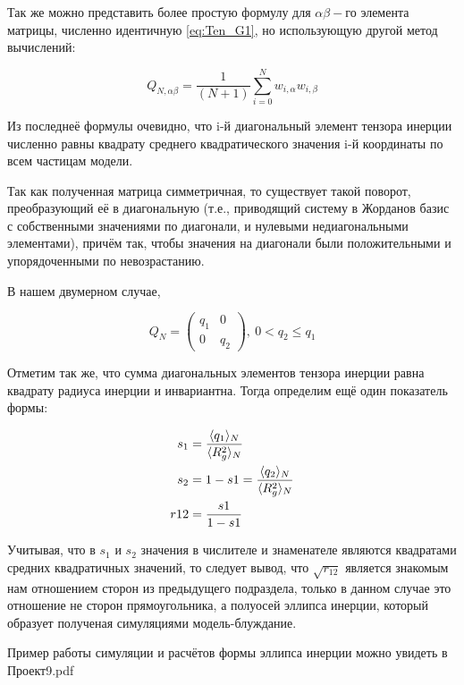 Так же можно представить более простую формулу для  $\alpha\beta-$го элемента матрицы, численно идентичную \eqref{eq:Ten_G1}, но использующую другой метод вычислений:

\begin{equation}\label{eq:Ten_G2}
    Q_{N,\alpha\beta} = \frac{1}{(N+1)} \sum_{i=0}^{N} w_{i, \alpha} w_{i, \beta}
\end{equation}

Из последнеё формулы очевидно, что i-й диагональный элемент тензора инерции численно равны квадрату среднего квадратического значения i-й координаты по всем частицам модели.

Так как полученная матрица симметричная, то существует такой поворот, преобразующий её в диагональную (т.е., приводящий систему в Жорданов базис с собственными значениями по диагонали, и нулевыми недиагональными элементами), причём так, чтобы значения на диагонали были положительными и упорядоченными по невозрастанию.

В нашем двумерном случае, 

\begin{equation*}
    Q_{N} = \left(
    \begin{array}{cc}
      q_{1} & 0 \\
      0 & q_{2}
    \end{array} \right),\ 0 < q_{2} \leq q_{1}
\end{equation*}

Отметим так же, что сумма диагональных элементов тензора инерции равна квадрату радиуса инерции и инвариантна. Тогда определим ещё один показатель формы:

\begin{align*}
    s_{1} &= \frac{\langle q_{1} \rangle_{N}}{\langle R_{g}^{2} \rangle_{N}}\\
    s_{2} &= 1 - s1 = \frac{\langle q_{2} \rangle_{N}}{\langle R_{g}^{2} \rangle_{N}}\\
    r12 &= \frac{s1}{1-s1}
\end{align*}

Учитывая, что в $s_{1}$ и $s_{2}$ значения в числителе и знаменателе являются квадратами средних квадратичных значений, то следует вывод, что $\sqrt{r_{12}}$ является знакомым нам отношением сторон из предыдущего подраздела, только в данном случае это отношение не сторон прямоугольника, а полуосей эллипса инерции, который образует полученая симуляциями модель-блуждание.

Пример работы симуляции и расчётов формы эллипса инерции можно увидеть в Проект9.pdf\cite{Git}